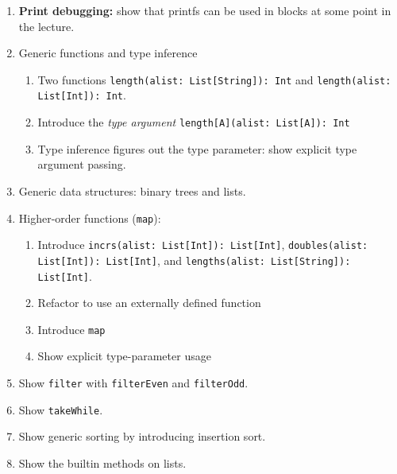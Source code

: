 \documentclass[9pt]{extbook}
\begin{document}
\begin{enumerate}

  \item \textbf{Print debugging:} show that printfs can be used in blocks at some point in the lecture.

  \item Generic functions and type inference

  \begin{enumerate}

  \item Two functions \lstinline|length(alist: List[String]): Int| and \lstinline|length(alist: List[Int]): Int|.

  \item Introduce the \emph{type argument} \lstinline|length[A](alist: List[A]): Int|

  \item Type inference figures out the type parameter: show explicit type argument passing.

  \end{enumerate}

  \item Generic data structures: binary trees and lists.

  \item Higher-order functions (\lstinline|map|):

  \begin{enumerate}

    \item Introduce \lstinline|incrs(alist: List[Int]): List[Int]|,
      \lstinline|doubles(alist: List[Int]): List[Int]|, and \lstinline|lengths(alist: List[String]): List[Int]|.

    \item Refactor to use an externally defined function

    \item Introduce \lstinline|map|

    \item Show explicit type-parameter usage

  \end{enumerate}

  \item Show \lstinline|filter| with \lstinline|filterEven| and \lstinline|filterOdd|.

  \item Show \lstinline|takeWhile|.

  \item Show generic sorting by introducing insertion sort.

  \item Show the builtin methods on lists.

\end{enumerate}
\end{document}
